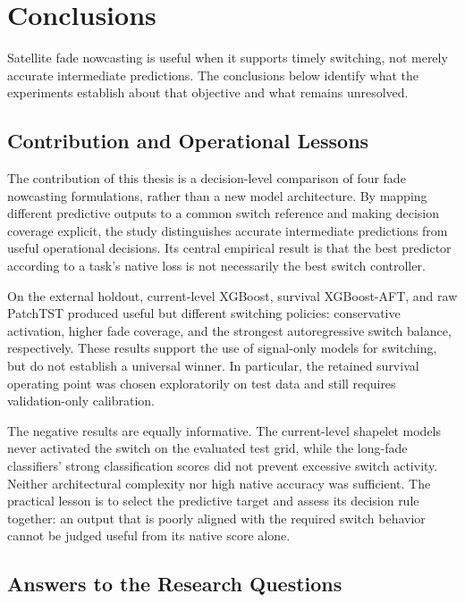 \chapter{Conclusions}
\label{chap:conclusions}

Satellite fade nowcasting is useful when it supports timely switching, not
merely accurate intermediate predictions. The conclusions below identify what
the experiments establish about that objective and what remains unresolved.

\section{Contribution and Operational Lessons}

The contribution of this thesis is a decision-level comparison of four fade
nowcasting formulations, rather than a new model architecture. By mapping
different predictive outputs to a common switch reference and making decision
coverage explicit, the study distinguishes accurate intermediate predictions
from useful operational decisions. Its central empirical result is that the
best predictor according to a task's native loss is not necessarily the best
switch controller.

On the external holdout, current-level XGBoost, survival XGBoost-AFT, and raw
PatchTST produced useful but different switching policies: conservative
activation, higher fade coverage, and the strongest autoregressive switch
balance, respectively. These results support the use of signal-only models
for switching, but do not establish a universal winner.
In particular, the retained survival operating point was chosen exploratorily
on test data and still requires validation-only calibration.

The negative results are equally informative. The current-level shapelet
models never activated the switch on the evaluated test grid, while the
long-fade classifiers' strong classification scores did not prevent excessive
switch activity. Neither architectural complexity nor high native accuracy
was sufficient. The practical lesson is to select the predictive target and
assess its decision rule together: an output that is poorly aligned with the
required switch behavior cannot be judged useful from its native score alone.

\section{Answers to the Research Questions}

